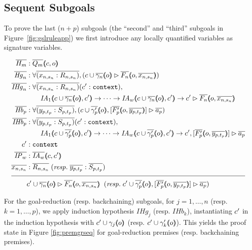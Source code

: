 \subsection{Sequent Subgoals}

To prove the last ($n + p$) subgoals (the ``second'' and ``third'' subgoals in Figure~\ref{fig:gslruleapp}) we first introduce any locally quantified variables as signature variables.

\newpage

\begin{align*}
\ol{H_m} &: \ol{Q_m} \args{c , o} \\
\ol{\mathit{Hg}_n} &: \forall \ol{(x_{n,s_n} : R_{n,s_n})}, (\seqsl[c \cup \ol{\gamma_n} \args{o}]{\ol{F_n} \args{o , \ol{x_{n,s_n}}})} \\
\ol{\mathit{IHg}_n} &: \forall \ol{(x_{n,s_n} : R_{n,s_n})} (\inddyncon{} : \sltm{context}), \\
& \qquad \mathit{IA}_1 \args{c \cup \ol{\gamma_n} \args{o} , \inddyncon{}} \rightarrow \dots \rightarrow \mathit{IA}_w \args{c \cup \ol{\gamma_n} \args{o} , \inddyncon{}} \rightarrow \seqsl[\inddyncon{}]{\ol{F_n} \args{o , \ol{x_{n,s_n}}}} \\
\ol{\mathit{Hb}_p} &: \forall \ol{(y_{p,t_p} : S_{p,t_p})}, (\bchsl[c \cup \ol{\gamma'_p} \args{o}]{\ol{F'_p} \args{o , \ol{y_{p,t_p}}}}{\ol{a_p}}) \\
\ol{\mathit{IHb}_p} &: \forall \ol{(y_{p,t_p} : S_{p,t_p})} (\inddyncon{} : \sltm{context}), \\
& \qquad \mathit{IA}_1 \args{c \cup \ol{\gamma'_p} \args{o} , \inddyncon{}} \rightarrow \dots \rightarrow \mathit{IA}_w \args{c \cup \ol{\gamma'_p} \args{o} , \inddyncon{}} \rightarrow \bchsl[\inddyncon{}]{\ol{F'_p} \args{o , \ol{y_{p,t_p}}}}{\ol{a_p}} \\
\inddyncon{} &: \sltm{context} \\
\ol{\mathit{IP}_w} &: \ol{\mathit{IA}_w} \args{c , \inddyncon{}} \\
\ol{x_{n,s_n}} &: \ol{R_{n,s_n}} \; (\mathit{resp.} \; \ol{y_{p,t_p}} : \ol{S_{p,t_p}}) \\[\pfshift{}]
\cline{1-2}
& \seqsl[\inddyncon{} \cup \ol{\gamma_n} \args{o}]{\ol{F_n} \args{o , \ol{x_{n,s_n}}}} \;\; (\mathit{resp.} \; \bchsl[\inddyncon{} \cup \ol{\gamma'_p} \args{o}]{\ol{F'_p} \args{o , \ol{y_{p,t_p}}}}{\ol{a_p}})
\end{align*}

For the goal-reduction (resp. backchaining) subgoals, for $j = 1 , \ldots , n$ (resp. $k = 1 , \ldots , p$), we apply induction hypothesis $\mathit{IHg}_j$ (resp. $\mathit{IHb}_k$), instantiating $c'{}$ in the induction hypothesis with $c'{} \cup \gamma_j (\hspace{-0.35em} \langle o \rangle \hspace{-0.35em})$ (resp. $c'{} \cup \gamma'_k (\hspace{-0.35em} \langle o \rangle \hspace{-0.35em})$). This yields the proof state in Figure \ref{fig:premgrseq} for goal-reduction premises (resp. backchaining premises).

